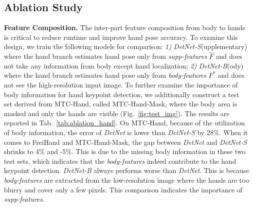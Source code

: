 \documentclass[final]{cvpr}
\begin{document}
 \subsection{Ablation Study}
\label{sec:ablation}
\noindent \textbf{Feature Composition.}
The inter-part feature composition from body to hands is critical to reduce runtime and improve hand pose accuracy.
To examine this design, we train the following models for comparison:
\textit{1)} \textit{DetNet-S}(upplementary) where the hand branch estimates hand pose only from \textit{supp-features} $\hat{F}$ and does not take any information from body except hand localization;
\textit{2)} \textit{DetNet-B}(ody) where the hand branch estimates hand pose only from \textit{body-features} $F^*$ and does not see the high-resolution input image.
To further examine the importance of body information for hand keypoint detection, we additionally construct a test set derived from MTC-Hand, called MTC-Hand-Mask, where the body area is masked and only the hands are visible (Fig.~\ref{fig:test_img}).
The results are reported in Tab.~\ref{tab:ablation_hand}.
On MTC-Hand, because of the utilization of body information, the error of \textit{DetNet} is lower than \textit{DetNet-S} by 28\%.
When it comes to FreiHand and MTC-Hand-Mask, the gap between \textit{DetNet} and \textit{DetNet-S} shrinks to 4\% and \mbox{-5\%}.
This is due to the missing body information in these two test sets, which indicates that the \textit{body-features} indeed contribute to the hand keypoint detection.
\textit{DetNet-B} always performs worse than \textit{DetNet}.
This is because \textit{body-features} are extracted from the low-resolution image where the hands are too blurry and cover only a few pixels.
This comparison indicates the importance of \textit{supp-features}.
\begin{table}[t]
  \centering
  \caption{
Ablation study on \textit{body-features} and \textit{supp-features}.
The comparison between the three versions demonstrates the help of $F^*$ and $\hat{F}$ in the hand pose estimation task.
}
	\label{tab:ablation_hand}
\end{table}
\end{document}
